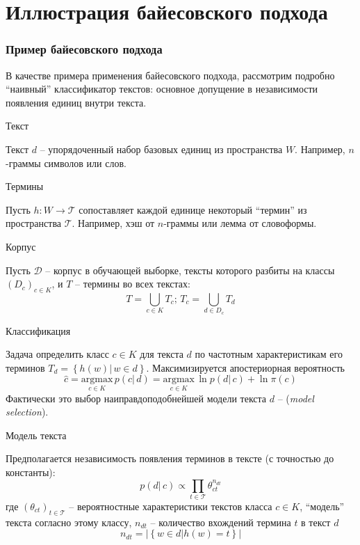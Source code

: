\documentclass{beamer}
\newcommand{\eng}[1]{\foreignlanguage{english}{#1}}
\newcommand{\obj}[1]{\left\{ #1 \right \}}
\newcommand{\brac}[1]{\left ( #1 \right )}
\newcommand{\induc}[1]{\left . #1 \right \vert}
\newcommand{\abs}[1]{\left | #1 \right |}
\newcommand{\Dcal}{\mathcal{D}}
\newcommand{\Tcal}{\mathcal{T}}
\begin{document}
\section{Иллюстрация байесовского подхода} %
\label{sec:bayes_demonstration}
\begin{frame}\frametitle{Пример байесовского подхода}
  \begin{block}

    В качестве примера применения байесовского подхода, рассмотрим подробно ``наивный'' классификатор текстов: основное допущение в независимости появления единиц внутри текста.
  \end{block}
  \begin{block}{Текст}

    Текст $d$ -- упорядоченный набор базовых единиц из пространства $W$.
    Например, $n$-граммы символов или слов.
  \end{block}
  \begin{block}{Термины}

    Пусть $h:W\to \Tcal$ сопоставляет каждой единице некоторый ``термин'' из пространства $\Tcal$. Например, хэш от $n$-граммы или лемма от словоформы.
  \end{block}
\end{frame}

\begin{frame}
  \begin{block}{Корпус}

    Пусть $\Dcal$ -- корпус в обучающей выборке, тексты которого разбиты на классы $\brac{D_c}_{c\in K}$, и $T$ -- термины во всех текстах:
    \[T = \bigcup_{c\in K}T_c;\,T_c = \bigcup_{d\in D_c} T_d\]
  \end{block}

  \begin{block}{Классификация}

    Задача определить класс $c\in K$ для текста $d$ по частотным характеристикам его терминов $T_d = \obj{\induc{h(w)}\,w\in d}$.
    Максимизируется апостериорная вероятность 
   \[\hat{c} = \underset{c\in K}{\text{argmax}}\,p\brac{\induc{c}\,d} = \underset{c\in K}{\text{argmax}}\,\ln p\brac{\induc{d}\,c} + \ln \pi\brac{c} \]
    Фактически это выбор наиправдоподобнейшей модели текста $d$ -- (\eng{\emph{model selection}}).
  \end{block}
\end{frame}

\begin{frame}
  \begin{block}{Модель текста}

    Предполагается независимость появления терминов в тексте (с точностью до константы):
    \[p\brac{\induc{d}\,c} \propto \prod_{t\in \Tcal}\theta_{ct}^{n_{dt}}\]
    где $\brac{\theta_{ct}}_{t\in \Tcal}$ -- вероятностные характеристики текстов класса $c\in K$, ``модель'' текста согласно этому классу, $n_{dt}$ -- количество вхождений термина $t$ в текст $d$
    \[n_{dt} = \abs{\obj{\induc{w\in d} h(w) = t}}\]
  \end{block}

\end{frame}
\end{document}
